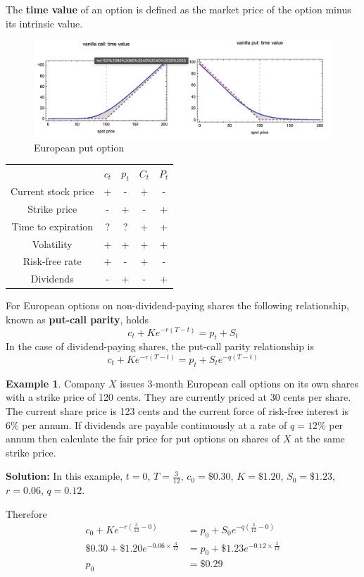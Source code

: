\documentclass[11pt,a4paper]{book}
\theoremstyle{definition}\newtheorem{definition}{Definition}
\theoremstyle{definition}\newtheorem{fact}{Fact}
\theoremstyle{definition}\newtheorem{remark}{Remark}
\theoremstyle{definition}\newtheorem{ex}{Ex.}
\theoremstyle{definition}\newtheorem{project}{Project}
\theoremstyle{definition}\newtheorem{problem}{Problem}
\theoremstyle{definition}\newtheorem{example}{Example}
\numberwithin{theorem}{section}
\numberwithin{corollary}{chapter}
\numberwithin{assumption}{chapter}
\numberwithin{definition}{chapter}
\numberwithin{prop}{chapter}
\numberwithin{notation}{chapter}
\numberwithin{problem}{chapter}
\numberwithin{example}{chapter}
\numberwithin{fact}{chapter}
\numberwithin{ex}{chapter}
\begin{document}
The \textbf{time value} of an option is defined as the market price of the option minus its intrinsic value.

\begin{figure}[H]
	\centering
	\includegraphics[scale=0.5]{Chapter03/Chapter3_3.png}
	\caption{European put option}
\end{figure}

\begin{table}[H]
\centering
\begin{tabular}{ccccc}
\hline
 & $c_t$ & $p_t$ & $C_t$ & $P_t$ \\
Current stock price & + & - & + & - \\
Strike price & - & + & - & + \\
Time to expiration & ? & ? & + & + \\
Volatility & + & + & + & + \\
Risk-free rate & + & - & + & - \\
Dividends & - & + & - & + \\
\end{tabular}
\end{table}

For European options on non-dividend-paying shares the following relationship, known as \textbf{put-call parity}, holds
\begin{equation}
c_t + K e^{-r(T-t)} = p_t + S_t
\end{equation}
In the case of dividend-paying shares, the put-call parity relationship is
\begin{equation}
c_t + K e^{-r(T-t)} = p_t + S_te^{-q(T-t)}
\end{equation}

\begin{example}
Company $X$ issues 3-month European call options on its own shares with a strike price of 120 cents. They are currently priced at 30 cents per share. The current share price is 123 cents and the current force of risk-free interest is 6\% per annum. If dividends are payable continuously at a rate of $q = 12\%$ per annum then calculate the fair price for put options on shares of $X$ at the same strike price.

\pagebreak
\textbf{Solution:}
In this example, $t=0$, $T = \frac{3}{12}$, $c_0 = \$0.30$, $K=\$1.20$, $S_0 = \$ 1.23$, $r=0.06$, $q=0.12$.

Therefore
\begin{align*}
c_0 + K e^{-r(\frac{3}{12}-0)} &= p_0 + S_0e^{-q(\frac{3}{12}-0)}  \\
\$0.30 + \$1.20 e^{-0.06 \times\frac{3}{12}} &= p_0 + \$1.23 e^{-0.12\times \frac{3}{12}} \\
p_0 &= \$0.29
\end{align*}
\end{example}
\end{document}

